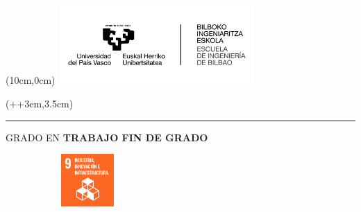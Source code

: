 
\begin{titlepage}
    \begin{textblock*}{\textwidth}(10cm,0cm)
        \includegraphics[width=7.5cm, height=3cm]{images/logos/Logo_EHU.jpg}
    \end{textblock*}
    
    
    \begin{textblock*}{\paperwidth}(\dimexpr\parindent+\oddsidemargin+3em\relax,3.5cm)
        \begin{minipage}{\dimexpr\linewidth-7.5cm\relax}
            \color{white}
            \noindent\rule{\linewidth}{0cm}
            \textsf{ {\large GRADO EN \grado}}
            \newline
            \newline \newline
            \textsf{\textbf{ {\Huge TRABAJO FIN DE GRADO }}}
        \end{minipage}
    \end{textblock*}
    
    \vspace*{3.5cm}
    \begin{minipage}{\linewidth}
        \setlength{\baselineskip}{1.7\baselineskip}
        \centering
        \textsf{ \textbf{ {\LARGE \titulo }}}
    \end{minipage}

    \vspace*{0.5cm}
    \begin{figure}[H]
        \centering
        
    \end{figure}

    \vspace*{1cm}
    \begin{figure}[h]
    \centering
        \begin{subfigure}[b]{0.135\textwidth}
            \includegraphics[width=2cm, height=2cm]{images/iconos_ods/09.png}
        \end{subfigure}
        

\end{figure}
\end{titlepage}
